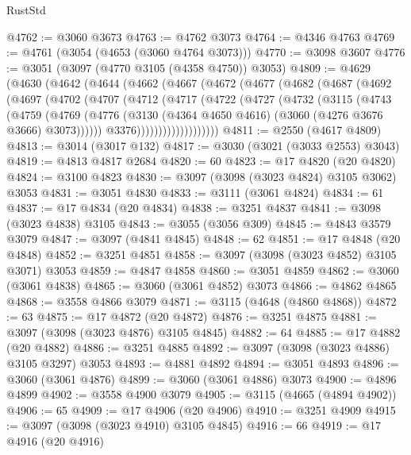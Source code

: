 \begin{lexlean}{RustStd}
\begin{coremodule}
@4762 := @3060 @3673
@4763 := @4762 @3073
@4764 := @4346 @4763
@4769 := @4761 (@3054 (@4653 (@3060 @4764 @3073)))
@4770 := @3098 @3607
@4776 := @3051 (@3097 (@4770 @3105 (@4358 @4750)) @3053)
@4809 := @4629
    (@4630
      (@4642
        (@4644
          (@4662
            (@4667
              (@4672
                (@4677
                  (@4682
                    (@4687
                      (@4692
                        (@4697
                          (@4702
                            (@4707
                              (@4712
                                (@4717
                                  (@4722
                                    (@4727
                                      (@4732
                                        (@3115
                                          (@4743
                                            (@4759
                                              (@4769
                                                (@4776
                                                  (@3130
                                                    (@4364 @4650 @4616)
                                                    (@3060 (@4276 @3676 @3666) @3073))))))
                                          @3376)))))))))))))))))))
@4811 := @2550 (@4617 @4809)
@4813 := @3014 (@3017 @132)
@4817 := @3030 (@3021 (@3033 @2553) @3043)
@4819 := @4813 @4817 @2684
@4820 := 60
@4823 := @17 @4820 (@20 @4820)
@4824 := @3100 @4823
@4830 := @3097 (@3098 (@3023 @4824) @3105 @3062) @3053
@4831 := @3051 @4830
@4833 := @3111 (@3061 @4824)
@4834 := 61
@4837 := @17 @4834 (@20 @4834)
@4838 := @3251 @4837
@4841 := @3098 (@3023 @4838) @3105
@4843 := @3055 (@3056 @309)
@4845 := @4843 @3579 @3079
@4847 := @3097 (@4841 @4845)
@4848 := 62
@4851 := @17 @4848 (@20 @4848)
@4852 := @3251 @4851
@4858 := @3097 (@3098 (@3023 @4852) @3105 @3071) @3053
@4859 := @4847 @4858
@4860 := @3051 @4859
@4862 := @3060 (@3061 @4838)
@4865 := @3060 (@3061 @4852) @3073
@4866 := @4862 @4865
@4868 := @3558 @4866 @3079
@4871 := @3115 (@4648 (@4860 @4868))
@4872 := 63
@4875 := @17 @4872 (@20 @4872)
@4876 := @3251 @4875
@4881 := @3097 (@3098 (@3023 @4876) @3105 @4845)
@4882 := 64
@4885 := @17 @4882 (@20 @4882)
@4886 := @3251 @4885
@4892 := @3097 (@3098 (@3023 @4886) @3105 @3297) @3053
@4893 := @4881 @4892
@4894 := @3051 @4893
@4896 := @3060 (@3061 @4876)
@4899 := @3060 (@3061 @4886) @3073
@4900 := @4896 @4899
@4902 := @3558 @4900 @3079
@4905 := @3115 (@4665 (@4894 @4902))
@4906 := 65
@4909 := @17 @4906 (@20 @4906)
@4910 := @3251 @4909
@4915 := @3097 (@3098 (@3023 @4910) @3105 @4845)
@4916 := 66
@4919 := @17 @4916 (@20 @4916)

\end{coremodule}
\end{lexlean}
